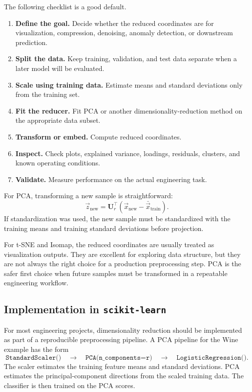 \documentclass[12pt,letter]{article}
\newcommand{\mat}[1]{\mathbf{#1}}
\newcommand{\vct}[1]{\vec{#1}}
\begin{document}
The following checklist is a good default.

\begin{enumerate}[itemsep=0.25ex]
    \item \textbf{Define the goal.} Decide whether the reduced coordinates are for visualization, compression, denoising, anomaly detection, or downstream prediction.
    \item \textbf{Split the data.} Keep training, validation, and test data separate when a later model will be evaluated.
    \item \textbf{Scale using training data.} Estimate means and standard deviations only from the training set.
    \item \textbf{Fit the reducer.} Fit PCA or another dimensionality-reduction method on the appropriate data subset.
    \item \textbf{Transform or embed.} Compute reduced coordinates.
    \item \textbf{Inspect.} Check plots, explained variance, loadings, residuals, clusters, and known operating conditions.
    \item \textbf{Validate.} Measure performance on the actual engineering task.
\end{enumerate}

For PCA, transforming a new sample is straightforward:
\begin{equation}
    \vct{z}_{\mathrm{new}}
    =
    \mat{U}_{r}^{\top}\left(\vct{x}_{\mathrm{new}}-\bar{\vct{x}}_{\mathrm{train}}\right).
    \label{eq:dimred_new_sample_projection}
\end{equation}
If standardization was used, the new sample must be standardized with the training means and training standard deviations before projection.

For t-SNE and Isomap, the reduced coordinates are usually treated as visualization outputs. They are excellent for exploring data structure, but they are not always the right choice for a production preprocessing step. PCA is the safer first choice when future samples must be transformed in a repeatable engineering workflow.


\subsection{Implementation in \texttt{scikit-learn}}

For most engineering projects, dimensionality reduction should be implemented as part of a reproducible preprocessing pipeline. A PCA pipeline for the Wine example has the form
\begin{equation}
\texttt{StandardScaler()}
\quad\rightarrow\quad
\texttt{PCA(n\_components=r)}
\quad\rightarrow\quad
\texttt{LogisticRegression()}.
\end{equation}
The scaler estimates the training feature means and standard deviations. PCA estimates the principal-component directions from the scaled training data. The classifier is then trained on the PCA scores.
\end{document}

